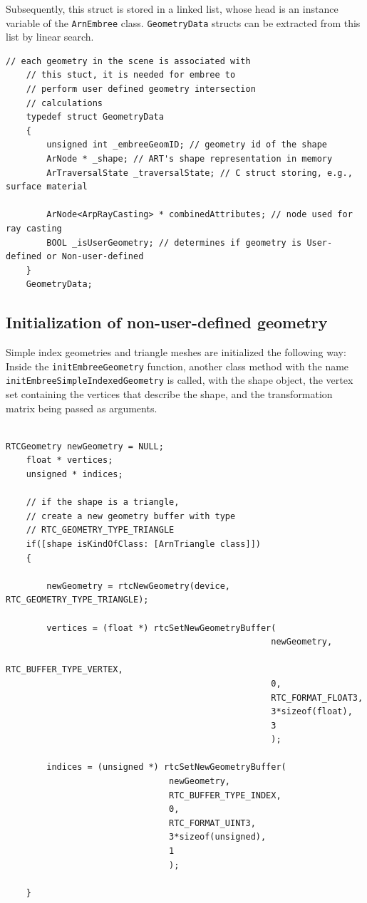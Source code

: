 Subsequently, this struct is stored in a linked list, whose head is an instance variable of the \texttt{ArnEmbree} class. \texttt{GeometryData} structs can be extracted from this list by linear search.
 

\begin{listing} 
	\begin{lstlisting}[caption={\texttt{C} struct associated with each initialized geometry.}, label={lst:geometry_data}]
	// each geometry in the scene is associated with
	// this stuct, it is needed for embree to
	// perform user defined geometry intersection
	// calculations
	typedef struct GeometryData 
	{
		unsigned int _embreeGeomID; // geometry id of the shape
		ArNode * _shape; // ART's shape representation in memory
		ArTraversalState _traversalState; // C struct storing, e.g., surface material
		
		ArNode<ArpRayCasting> * combinedAttributes; // node used for ray casting
		BOOL _isUserGeometry; // determines if geometry is User-defined or Non-user-defined
	}
	GeometryData;
	\end{lstlisting}
\end{listing} 

\subsection{Initialization of non-user-defined geometry}
Simple index geometries and triangle meshes are initialized the following way: Inside the \texttt{initEmbreeGeometry} function, another class method with the name \texttt{initEmbreeSimpleIndexedGeometry} is called, with the shape object, the vertex set containing the vertices that describe the shape, and the transformation matrix being passed as arguments. 
\\
\\

\begin{listing} 
	\begin{lstlisting}[caption={Setting up geometry buffers for the vertices and indices of a triangle shape.}, label={lst:geometry_buffer}]
	RTCGeometry newGeometry = NULL;
	float * vertices;
	unsigned * indices;
	
	// if the shape is a triangle, 
	// create a new geometry buffer with type
	// RTC_GEOMETRY_TYPE_TRIANGLE
	if([shape isKindOfClass: [ArnTriangle class]]) 
	{
	
		newGeometry = rtcNewGeometry(device, RTC_GEOMETRY_TYPE_TRIANGLE);
		
		vertices = (float *) rtcSetNewGeometryBuffer(
													newGeometry,
													RTC_BUFFER_TYPE_VERTEX,
													0,
													RTC_FORMAT_FLOAT3,
													3*sizeof(float),
													3
													);
		
		indices = (unsigned *) rtcSetNewGeometryBuffer(
		                        newGeometry,
		                        RTC_BUFFER_TYPE_INDEX,
		                        0,
		                        RTC_FORMAT_UINT3,
		                        3*sizeof(unsigned),
		                        1
		                        );
	
	}
	\end{lstlisting}
\end{listing}


